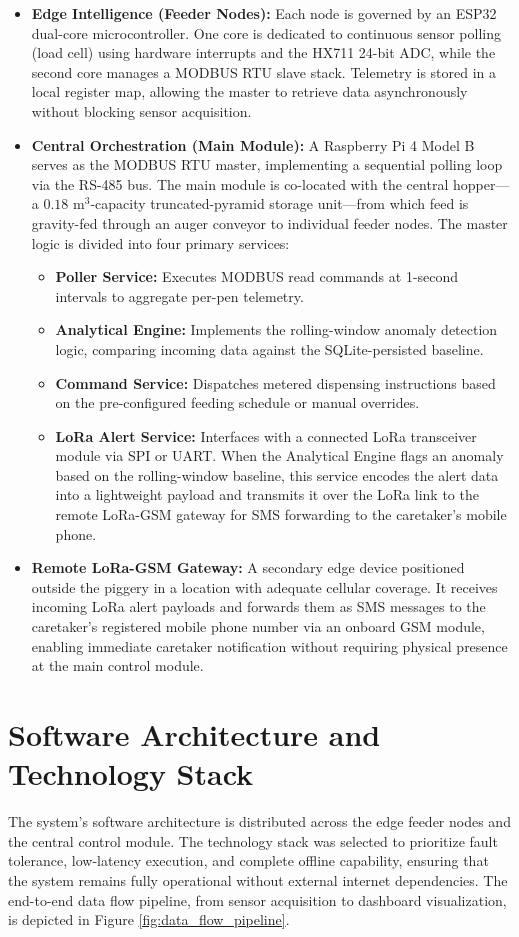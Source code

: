 \begin{itemize}
  \item \textbf{Edge Intelligence (Feeder Nodes):} Each node is governed by an ESP32 dual-core microcontroller. One core is dedicated to continuous sensor polling (load cell) using hardware interrupts and the HX711 24-bit ADC, while the second core manages a MODBUS RTU slave stack. Telemetry is stored in a local register map, allowing the master to retrieve data asynchronously without blocking sensor acquisition.
  \item \textbf{Central Orchestration (Main Module):} A Raspberry Pi 4 Model B serves as the MODBUS RTU master, implementing a sequential polling loop via the RS-485 bus. The main module is co-located with the central hopper---a $0.18\text{ m}^3$-capacity truncated-pyramid storage unit---from which feed is gravity-fed through an auger conveyor to individual feeder nodes. The master logic is divided into four primary services:
    \begin{itemize}
      \item \textbf{Poller Service:} Executes MODBUS read commands at 1-second intervals to aggregate per-pen telemetry.
      \item \textbf{Analytical Engine:} Implements the rolling-window anomaly detection logic, comparing incoming data against the SQLite-persisted baseline.
      \item \textbf{Command Service:} Dispatches metered dispensing instructions based on the pre-configured feeding schedule or manual overrides.
      \item \textbf{LoRa Alert Service:} Interfaces with a connected LoRa transceiver module via SPI or UART. When the Analytical Engine flags an anomaly based on the rolling-window baseline, this service encodes the alert data into a lightweight payload and transmits it over the LoRa link to the remote LoRa-GSM gateway for SMS forwarding to the caretaker's mobile phone.
    \end{itemize}
  \item \textbf{Remote LoRa-GSM Gateway:} A secondary edge device positioned outside the piggery in a location with adequate cellular coverage. It receives incoming LoRa alert payloads and forwards them as SMS messages to the caretaker's registered mobile phone number via an onboard GSM module, enabling immediate caretaker notification without requiring physical presence at the main control module.
\end{itemize}

\section{Software Architecture and Technology Stack}
The system's software architecture is distributed across the edge feeder nodes and the central control module. The technology stack was selected to prioritize fault tolerance, low-latency execution, and complete offline capability, ensuring that the system remains fully operational without external internet dependencies. The end-to-end data flow pipeline, from sensor acquisition to dashboard visualization, is depicted in Figure \ref{fig:data_flow_pipeline}.

